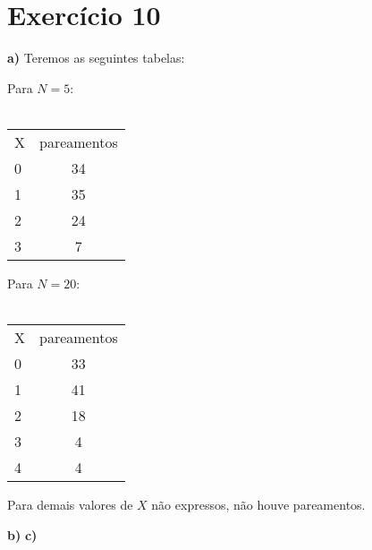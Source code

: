 \documentclass[12pt,letterpaper]{article}
\begin{document}
	\section*{Exercício 10}
	
	\textbf{a)} Teremos as seguintes tabelas:
		
	\begin{multicols}{2}
		Para $N = 5$:\\\\
		\begin{tabular}{|l|c|}
			\cline{1-2}
			X & pareamentos  \\ \cline{1-2}
			0 & 34 \\ 
			1 & 35 \\ 
			2 & 24 \\ 
			3 & 7  \\ \cline{1-2}
		\end{tabular}
		
		Para $N = 20$:\\\\
		\begin{tabular}{|l|c|}
			\cline{1-2}
			X & pareamentos  \\ \cline{1-2}
			0 & 33 \\ 
			1 & 41 \\ 
			2 & 18 \\
			3 & 4  \\
			4 & 4  \\ \cline{1-2}
		\end{tabular}
	\end{multicols}
		
	Para demais valores de $X$ não expressos, não houve pareamentos.
	
	
	
	
	
	\textbf{b)}
	\textbf{c)}
	
	
			 
\end{document}
